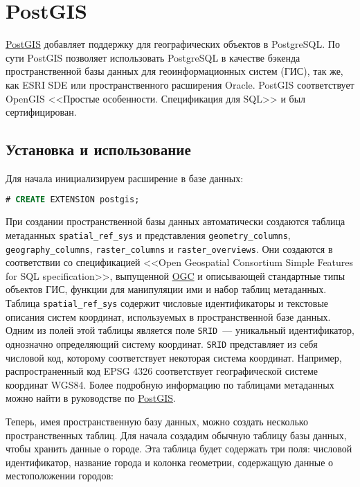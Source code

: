 \section{PostGIS}

\href{http://www.postgis.org/}{PostGIS} добавляет поддержку для географических объектов в PostgreSQL. По сути PostGIS позволяет использовать PostgreSQL в качестве бэкенда пространственной базы данных для геоинформационных систем (ГИС), так же, как ESRI SDE или пространственного расширения Oracle. PostGIS соответствует OpenGIS <<Простые особенности. Спецификация для SQL>> и был сертифицирован.

\subsection{Установка и использование}

Для начала инициализируем расширение в базе данных:

\begin{lstlisting}[language=SQL,label=lst:postgisinit,caption=Инициализация postgis]
# CREATE EXTENSION postgis;
\end{lstlisting}

При создании пространственной базы данных автоматически создаются таблица метаданных \lstinline!spatial_ref_sys! и представления \lstinline!geometry_columns!, \lstinline!geography_columns!, \lstinline!raster_columns! и \lstinline!raster_overviews!. Они создаются в соответствии со спецификацией <<Open Geospatial Consortium Simple Features for SQL specification>>, выпущенной \href{http://www.opengeospatial.org/}{OGC} и описывающей стандартные типы объектов ГИС, функции для манипуляции ими и набор таблиц метаданных. Таблица \lstinline!spatial_ref_sys! содержит числовые идентификаторы и текстовые описания систем координат, используемых в пространственной базе данных. Одним из полей этой таблицы является поле \lstinline!SRID!~--- уникальный идентификатор, однозначно определяющий систему координат. \lstinline!SRID! представляет из себя числовой код, которому соответствует некоторая система координат. Например, распространенный код EPSG 4326 соответствует географической системе координат WGS84. Более подробную информацию по таблицами метаданных можно найти в руководстве по \href{http://postgis.net/docs/manual-2.3/using_postgis_dbmanagement.html#spatial_ref_sys}{PostGIS}.

Теперь, имея пространственную базу данных, можно создать несколько пространственных таблиц. Для начала создадим обычную таблицу базы данных, чтобы хранить данные о городе. Эта таблица будет содержать три поля: числовой идентификатор, название города и колонка геометрии, содержащую данные о местоположении городов:

